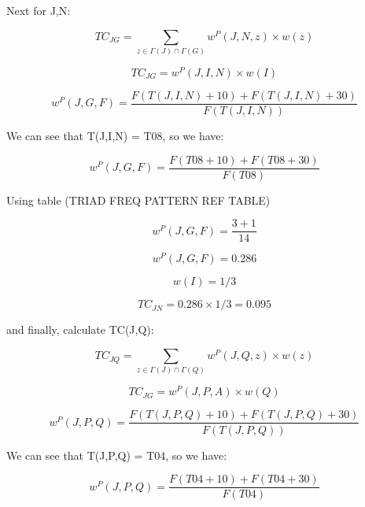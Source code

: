 Next for J,N:

\begin{equation}
TC_{JG} = \sum_{z\in \Gamma(J)\cap \Gamma(G)} w^{P}(J, N, z) \times w(z)  
\end{equation}

\begin{equation}
TC_{JG} = w^{P}(J, I, N) \times w(I)  
\end{equation}

\begin{equation}
w^{P}(J,G,F) = \frac{F(T(J,I,N) + 10) + F(T(J,I,N) + 30)}{F(T(J,I,N))}
\end{equation}

We can see that T(J,I,N) = T08, so we have:

\begin{equation}
w^{P}(J,G,F) = \frac{F(T08 + 10) + F(T08 + 30)}{F(T08)}
\end{equation}

Using table (TRIAD FREQ PATTERN REF TABLE)

\begin{equation}
w^{P}(J,G,F) = \frac{3 + 1}{14}
\end{equation}

\begin{equation}
w^{P}(J,G,F) = 0.286
\end{equation}

\begin{equation}
w(I)=1/3
\end{equation}

\begin{equation}
TC_{JN} = 0.286 \times 1/3 = 0.095
\end{equation}


and finally, calculate TC(J,Q):


\begin{equation}
TC_{JQ} = \sum_{z\in \Gamma(J)\cap \Gamma(Q)} w^{P}(J, Q, z) \times w(z)  
\end{equation}

\begin{equation}
TC_{JG} = w^{P}(J, P, A) \times w(Q)  
\end{equation}

\begin{equation}
w^{P}(J,P,Q) = \frac{F(T(J,P,Q) + 10) + F(T(J,P,Q) + 30)}{F(T(J,P,Q))}
\end{equation}

We can see that T(J,P,Q) = T04, so we have:

\begin{equation}
w^{P}(J,P,Q) = \frac{F(T04 + 10) + F(T04 + 30)}{F(T04)}
\end{equation}

